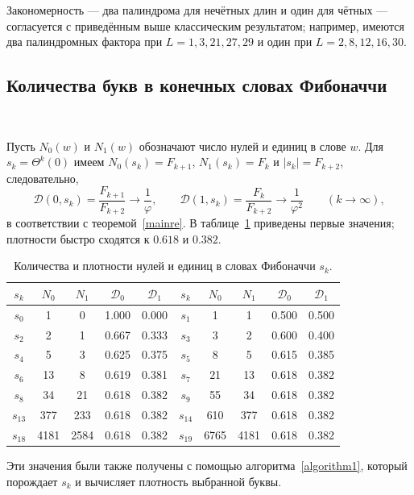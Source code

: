 \documentclass[a4paper,14pt]{extreport}
\theoremstyle{plain}
\theoremstyle{definition}
\theoremstyle{remark}
\begin{document}
Закономерность --- два палиндрома для нечётных длин и один для чётных --- согласуется с приведённым выше классическим
результатом; например, имеются два палиндромных фактора при $L=1,3,21,27,29$ и один при $L=2,8,12,16,30$.
\subsection{Количества букв в конечных словах Фибоначчи}~\label{sec3.4.5}

Пусть $N_0(w)$ и $N_1(w)$ обозначают число нулей и единиц в слове $w$. Для $s_k=\Theta^k(0)$ имеем
$N_0(s_k)=F_{k+1}$, $N_1(s_k)=F_k$ и $|s_k|=F_{k+2}$, следовательно,
\begin{equation}
	\mathscr D(0,s_k)=\frac{F_{k+1}}{F_{k+2}}\to\frac1\varphi,\qquad
	\mathscr D(1,s_k)=\frac{F_{k}}{F_{k+2}}\to\frac1{\varphi^{2}}\qquad(k\to\infty),
\end{equation}
в соответствии с теоремой~\ref{mainre}. В таблице~\ref{tab1densityfibwo} приведены первые значения; плотности
быстро сходятся к $0.618$ и $0.382$.

\begin{table}[H]
	\centering
	\begin{tabular}{|c|c|c|c|c||c|c|c|c|c|}
		\hline
		$s_k$ & $N_0$ & $N_1$ & $\mathscr D_0$ & $\mathscr D_1$ & $s_k$ & $N_0$ & $N_1$ & $\mathscr D_0$ & $\mathscr D_1$ \\
		\hline
		$s_0$ & 1 & 0 & 1.000 & 0.000 & $s_1$ & 1 & 1 & 0.500 & 0.500 \\
		$s_2$ & 2 & 1 & 0.667 & 0.333 & $s_3$ & 3 & 2 & 0.600 & 0.400 \\
		$s_4$ & 5 & 3 & 0.625 & 0.375 & $s_5$ & 8 & 5 & 0.615 & 0.385 \\
		$s_6$ & 13 & 8 & 0.619 & 0.381 & $s_7$ & 21 & 13 & 0.618 & 0.382 \\
		$s_8$ & 34 & 21 & 0.618 & 0.382 & $s_9$ & 55 & 34 & 0.618 & 0.382 \\
		$s_{13}$ & 377 & 233 & 0.618 & 0.382 & $s_{14}$ & 610 & 377 & 0.618 & 0.382 \\
		$s_{18}$ & 4181 & 2584 & 0.618 & 0.382 & $s_{19}$ & 6765 & 4181 & 0.618 & 0.382 \\
		\hline
	\end{tabular}
	\caption{Количества и плотности нулей и единиц в словах Фибоначчи $s_k$.}
	\label{tab1densityfibwo}
\end{table}

Эти значения были также получены с помощью алгоритма~\ref{algorithm1}, который порождает $s_k$ и вычисляет
плотность выбранной буквы.
\end{document}
